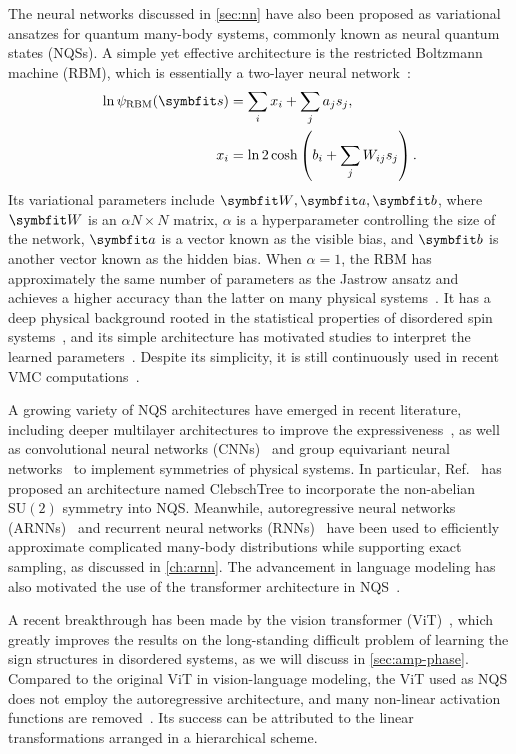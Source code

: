 The neural networks discussed in \cref{sec:nn} have also been proposed as variational ansatzes for quantum many-body systems, commonly known as neural quantum states (NQSs). A simple yet effective architecture is the restricted Boltzmann machine (RBM), which is essentially a two-layer neural network~\cite{carleo2017solving}:
\begin{align}
\ln \psi_\text{RBM}(\vs) &= \sum_i x_i + \sum_j a_j s_j, \\
x_i &= \ln 2 \cosh\left( b_i + \sum_j W_{i j} s_j \right).
\end{align}
Its variational parameters include $\mW, \va, \vb$, where $\mW$ is an $\alpha N \times N$ matrix, $\alpha$ is a hyperparameter controlling the size of the network, $\va$ is a vector known as the visible bias, and $\vb$ is another vector known as the hidden bias. When $\alpha = 1$, the RBM has approximately the same number of parameters as the Jastrow ansatz and achieves a higher accuracy than the latter on many physical systems~\cite{wu2024variational}. It has a deep physical background rooted in the statistical properties of disordered spin systems~\cite{sherrington1975solvable, hopfield1982neural}, and its simple architecture has motivated studies to interpret the learned parameters~\cite{abdollahi2016explainable, fernandez2023disentangling}. Despite its simplicity, it is still continuously used in recent VMC computations~\cite{nomura2017restricted, nomura2021dirac}.

A growing variety of NQS architectures have emerged in recent literature, including deeper multilayer architectures to improve the expressiveness~\cite{carleo2018constructing, sharir2022neural}, as well as convolutional neural networks (CNNs)~\cite{liang2018solving, choo2019two} and group equivariant neural networks~\cite{luo2021gauge, roth2021group} to implement symmetries of physical systems. In particular, Ref.~\cite{vieijra2021many} has proposed an architecture named ClebschTree to incorporate the non-abelian $\mathrm{SU}(2)$ symmetry into NQS. Meanwhile, autoregressive neural networks (ARNNs)~\cite{sharir2020deep} and recurrent neural networks (RNNs)~\cite{hibat2020recurrent, roth2020iterative} have been used to efficiently approximate complicated many-body distributions while supporting exact sampling, as discussed in \cref{ch:arnn}. The advancement in language modeling has also motivated the use of the transformer architecture in NQS~\cite{luo2021gauge, zhang2023transformer}.

A recent breakthrough has been made by the vision transformer (ViT)~\cite{viteritti2023transformer, viteritti2023transformer2, cao2024vision}, which greatly improves the results on the long-standing difficult problem of learning the sign structures in disordered systems, as we will discuss in \cref{sec:amp-phase}. Compared to the original ViT in vision-language modeling, the ViT used as NQS does not employ the autoregressive architecture, and many non-linear activation functions are removed~\cite{rende2024queries}. Its success can be attributed to the linear transformations arranged in a hierarchical scheme.

